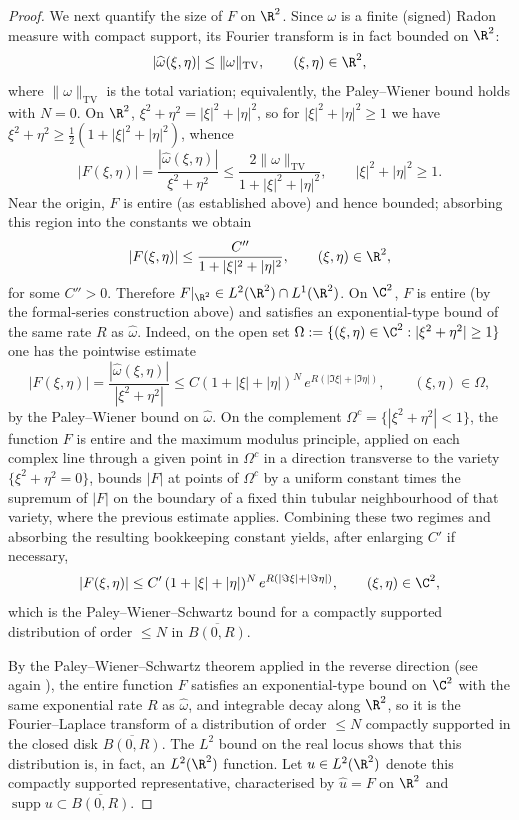 \begin{proof}
We next quantify the size of $F$ on $\R^2$. Since $\omega$ is a finite
(signed) Radon measure with compact support, its Fourier transform is in
fact bounded on $\R^2$:
\[
|\widehat{\omega}(\xi,\eta)|\le \|\omega\|_{\mathrm{TV}},
\qquad (\xi,\eta)\in\R^2,
\]
where $\|\omega\|_{\mathrm{TV}}$ is the total variation; equivalently,
the Paley--Wiener bound holds with $N=0$. On $\R^2$, $\xi^2+\eta^2=
|\xi|^2+|\eta|^2$, so for $|\xi|^2+|\eta|^2\ge 1$ we have $\xi^2+\eta^2
\ge \tfrac{1}{2}(1+|\xi|^2+|\eta|^2)$, whence
\[
|F(\xi,\eta)|=\frac{|\widehat\omega(\xi,\eta)|}{\xi^2+\eta^2}
\le \frac{2\|\omega\|_{\mathrm{TV}}}{1+|\xi|^2+|\eta|^2},
\qquad |\xi|^2+|\eta|^2\ge 1.
\]
Near the origin, $F$ is entire (as established above) and hence bounded;
absorbing this region into the constants we obtain
\[
|F(\xi,\eta)|\le \frac{C''}{1+|\xi|^2+|\eta|^2},
\qquad (\xi,\eta)\in\R^2,
\]
for some $C''>0$. Therefore $F|_{\R^2}\in L^2(\R^2)\cap L^1(\R^2)$. On
$\C^2$, $F$ is entire (by the formal-series construction above) and
satisfies an exponential-type bound of the same rate $R$ as
$\widehat\omega$. Indeed, on the open set
$\Omega:=\{(\xi,\eta)\in\C^2:|\xi^2+\eta^2|\ge 1\}$ one has the pointwise
estimate
\[
|F(\xi,\eta)|=\frac{|\widehat\omega(\xi,\eta)|}{|\xi^2+\eta^2|}
\le C(1+|\xi|+|\eta|)^{N}\,e^{R(|\Im\xi|+|\Im\eta|)},
\qquad (\xi,\eta)\in\Omega,
\]
by the Paley--Wiener bound on $\widehat\omega$. On the complement
$\Omega^c=\{|\xi^2+\eta^2|<1\}$, the function $F$ is entire and the
maximum modulus principle, applied on each complex line through a given
point in $\Omega^c$ in a direction transverse to the variety
$\{\xi^2+\eta^2=0\}$, bounds $|F|$ at points of $\Omega^c$ by a uniform
constant times the supremum of $|F|$ on the boundary of a fixed thin
tubular neighbourhood of that variety, where the previous estimate
applies. Combining these two regimes and absorbing the resulting
bookkeeping constant yields, after enlarging $C'$ if necessary,
\[
|F(\xi,\eta)|\le C'\,(1+|\xi|+|\eta|)^{N}\,
e^{R(|\Im \xi|+|\Im \eta|)},
\qquad (\xi,\eta)\in\C^2,
\]
which is the Paley--Wiener--Schwartz bound for a compactly supported
distribution of order $\le N$ in $\overline{B(0,R)}$.

By the Paley--Wiener--Schwartz theorem applied in the reverse direction
(see again \cite{Hormander}), the entire function $F$
satisfies an exponential-type bound on $\C^2$ with the same exponential
rate $R$ as $\widehat\omega$, and integrable decay along $\R^2$, so it is
the Fourier--Laplace transform of a distribution of order $\le N$
compactly supported in the closed disk $\overline{B(0,R)}$. The $L^2$
bound on the real locus shows that this distribution is, in fact, an
$L^2(\R^2)$ function. Let $u\in L^2(\R^2)$ denote this compactly supported
representative, characterised by $\widehat u = F$ on $\R^2$ and
$\operatorname{supp} u\subset \overline{B(0,R)}$.


\end{proof}
